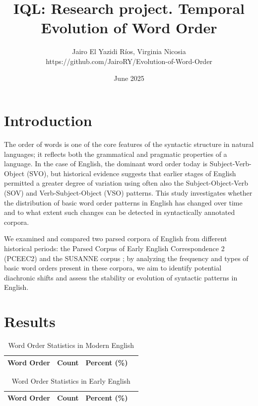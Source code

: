 \documentclass{article}
\title{IQL: Research project. Temporal Evolution of Word Order}
\author{Jairo El Yazidi Ríos, Virginia Nicosia \\
https://github.com/JairoRY/Evolution-of-Word-Order}
\date{June 2025}
\begin{document}
\maketitle

\section{Introduction}

The order of words is one of the core features of the syntactic structure in natural languages; it reflects both the grammatical and pragmatic properties of a language. In the case of English, the dominant word order today is Subject-Verb-Object (SVO), but historical evidence suggests that earlier stages of English permitted a greater degree of variation using often also  the Subject-Object-Verb (SOV) and Verb-Subject-Object (VSO) patterns. This study investigates whether the distribution of basic word order patterns in English has changed over time and to what extent such changes can be detected in syntactically annotated corpora.

We examined and compared two parsed corpora of English from different historical periods: the Parsed Corpus of Early English Correspondence 2 (PCEEC2) \cite{PCEEC2} and the SUSANNE corpus \cite{SUSANNE}; by analyzing the frequency and types of basic word orders present in these corpora, we aim to identify potential diachronic shifts and assess the stability or evolution of syntactic patterns in English.

\section{Results}

\begin{table}[H]
    \centering
    \label{tab:susanne}
    \begin{tabular}{lrrr}
        \hline
        Word Order & Count & Percent (\%) \\
        \hline
        
    \end{tabular}
    \caption{Word Order Statistics in Modern English}
\end{table}

\begin{table}[H]
    \centering
    \label{tab:pceec}
    \begin{tabular}{lrrr}
        \hline
        Word Order & Count & Percent (\%) \\
        \hline
        
    \end{tabular}
    \caption{Word Order Statistics in Early English}
\end{table}
\end{document}
